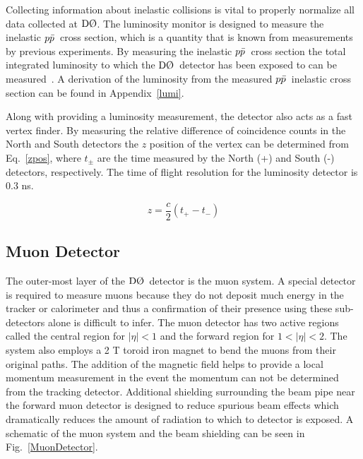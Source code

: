 Collecting information about inelastic collisions is vital to properly normalize all data collected at $\dzero$. The luminosity monitor is designed to measure the inelastic $\mbox{$p\bar{p}$}$~cross section, which is a quantity that is known from measurements by previous experiments. By measuring the inelastic $\mbox{$p\bar{p}$}$~cross section the total integrated luminosity to which the $\dzero$~detector has been exposed to can be measured~\cite{d0note4958,d0note5139}. A derivation of the luminosity from the measured $\mbox{$p\bar{p}$}$~inelastic cross section can be found in Appendix~\ref{lumi}.

Along with providing a luminosity measurement, the detector also acts as a fast vertex finder. By measuring the relative difference of coincidence counts in the North and South detectors the $z$ position of the vertex can be determined from Eq.~\ref{zpos}, where $t_{\pm}$ are the time measured by the North (+) and South (-) detectors, respectively. The time of flight resolution for the luminosity detector is 0.3 ns.

\begin{equation}
\label{zpos}
z = \frac{c}{2}(t_{+} - t_{-})
\end{equation}

\subsection{Muon Detector}
\label{muondetector}

The outer-most layer of the $\dzero$~detector is the muon system. A special detector is required to measure muons because they do not deposit much energy in the tracker or calorimeter and thus a confirmation of their presence using these sub-detectors alone is difficult to infer. The muon detector has two active regions called the central region for $|\eta|<1$ and the forward region for $1<|\eta|<2$. The system also employs a 2 T toroid iron magnet to bend the muons from their original paths. The addition of the magnetic field helps to provide a local momentum measurement in the event the momentum can not be determined from the tracking detector. Additional shielding surrounding the beam pipe near the forward muon detector is designed to reduce spurious beam effects which dramatically reduces the amount of radiation to which to detector is exposed. A schematic of the muon system and the beam shielding can be seen in Fig.~\ref{MuonDetector}.


